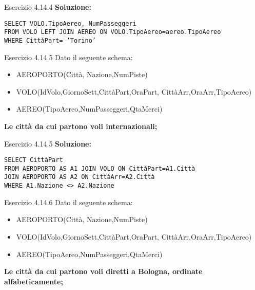 \begin{frame}{Esercizio 4.14.4}
    \textbf{Soluzione:}
    \vspace{1em}
    
    \texttt{SELECT VOLO.TipoAereo, NumPasseggeri\\FROM VOLO LEFT JOIN AEREO ON VOLO.TipoAereo=aereo.TipoAereo\\WHERE Citt\`aPart= `Torino'}
\end{frame}
\begin{frame}{Esercizio 4.14.5}
    Dato il seguente schema:
    \begin{itemize}
        \item AEROPORTO(Citt\`a, Nazione,NumPiste)
        \item VOLO(IdVolo,GiornoSett,Citt\`aPart,OraPart,
        Citt\`aArr,OraArr,TipoAereo)
        \item AEREO(TipoAereo,NumPasseggeri,QtaMerci)
    \end{itemize}
    \vspace{1em}
    
    \textbf{Le citt\`a da cui partono voli internazionali;}
\end{frame}

\begin{frame}{Esercizio 4.14.5}
    \textbf{Soluzione:}
    \vspace{1em}
    
    \texttt{SELECT Citt\`aPart \\FROM AEROPORTO AS A1 JOIN VOLO ON Citt\`aPart=A1.Citt\`a\\JOIN AEROPORTO AS A2 ON Citt\`aArr=A2.Citt\`a\\WHERE A1.Nazione <> A2.Nazione}
\end{frame}
\begin{frame}{Esercizio 4.14.6}
    Dato il seguente schema:
    \begin{itemize}
        \item AEROPORTO(Citt\`a, Nazione,NumPiste)
        \item VOLO(IdVolo,GiornoSett,Citt\`aPart,OraPart,
        Citt\`aArr,OraArr,TipoAereo)
        \item AEREO(TipoAereo,NumPasseggeri,QtaMerci)
    \end{itemize}
    \vspace{1em}
    
    \textbf{Le citt\`a da cui partono voli diretti a Bologna, ordinate alfabeticamente;}
\end{frame}

